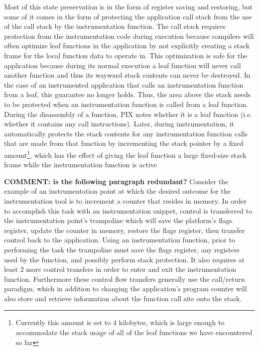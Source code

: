 Most of this state preservation is in the form of register saving and restoring, but 
some of it comes in the form of protecting the application call stack from the use of
the call stack by the instrumentation function. The call stack requires protection from the 
instrumentation code during execution because compilers will often optimize leaf functions in the application
by not explicitly creating a stack frame for the local function data to operate in. This optimization is safe for the application because during its
normal execution a leaf function will never call another function and thus its wayward stack contents 
can never be destroyed. In the case of an instrumented
application that calls an instrumentation function from a leaf, this guarantee no longer holds. Thus, the area above the stack needs to be protected when
an instrumentation function is called from a leaf function. During the disassembly 
of a function, PIX notes whether it is a leaf function (i.e. whether it contains any call
instructions). Later, during instrumentation, it automatically protects the stack contents 
for any instrumentation function calls that are made from that function by
incrementing the stack pointer by a fixed amount\footnote{Currently this amount is
set to 4 kilobytes, which is large enough to accommodate the stack usage of all
of the leaf functions we have encountered so far}, which has the effect of giving 
the leaf function a large fixed-size stack frame while the instrumentation
function is active

\textbf{COMMENT: is the following paragraph redundant?}
Consider the example of an instrumentation point at which the desired outcome 
for the instrumentation tool is to increment a counter that resides in memory. 
In order to accomplish this task with an instrumentation snippet, control is transferred to the
instrumentation point's trampoline which will save the platform's flags register, update the counter in memory, restore
the flags register, then transfer control back to the application. Using an instrumentation function, prior to performing
the task the trampoline must save the flags register, any registers used by the function, and
possibly perform stack protection.
It also requires at least 2 more control transfers in order to enter and exit the instrumentation function. 
Furthermore these control flow transfers generally use the call/return paradigm, which in addition to changing the
application's program counter will also store and retrieve information about the function call site onto the stack. 


